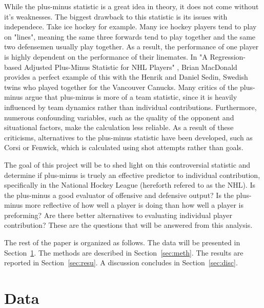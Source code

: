 \documentclass[12pt]{article}
\begin{document}
While the plus-minus statistic is a great idea in theory, it does not come without it's weaknesses. The biggest drawback to this
statistic is its issues with independece. Take ice hockey for example. Many ice hockey players tend to play on "lines", meaning the same three 
forwards tend to play together and the same two defensemen usually play together. As a result, the performance of one player is highly dependent 
on the performance of their linemates. In "A Regression-based Adjusted Plus-Minus Statistic for NHL Players" \cite{Macdonald_2011}, Brian
MacDonald provides a perfect example of this with the Henrik and Daniel Sedin, Swedish twins who played together for the Vancouver Canucks. 
 \cite[Daniel spent 92\% of his playing time with Henrik, the highest percentage of any other player combination where both players have
played over 700 minutes. Because of this high colinearity between the twins, it is difficult to separate the individual effect that each 
player has on the net goals scored on the ice.]{Macdonald_2012} Many critics of the plus-minus argue that plus-minus is more of a team 
statistic, since it is heavily influenced by team dynamics rather than individual contributions. Furthermore, numerous confounding variables, 
such as the quality of the opponent and situational factors, make the calculation less reliable. As a result of these criticisms, alternatives 
to the plus-minus statistic have been developed, such as Corsi or Fenwick, which is calculated using shot attempts rather than goals.

The goal of this project will be to shed light on this controversial statistic and determine if plus-minus is truely an effective predictor
to individual contribution, specifically in the National Hockey League (hereforth refered to as the NHL). Is the plus-minus a good evaluator 
of offensive and defensive output? Is the plus-minus more reflective of how well a player is doing than how well a player is preforming? 
Are there better alternatives to evaluating individual player contribution? These are the questions that will be answered from this analysis.




The rest of the paper is organized as follows.
The data will be presented in Section~\ref{sec:data}.
The methods are described in Section~\ref{sec:meth}.
The results are reported in Section~\ref{sec:resu}.
A discussion concludes in Section~\ref{sec:disc}.


\section{Data}
\label{sec:data}
\end{document}
